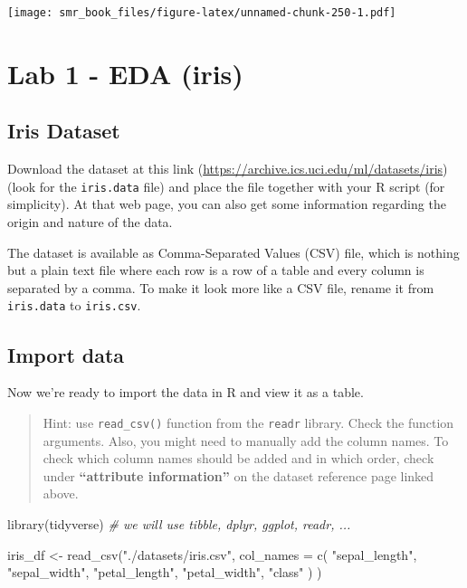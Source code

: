 \documentclass[
  oneside]{book}
\newenvironment{Shaded}{\begin{snugshade}}{\end{snugshade}}
\newcommand{\AttributeTok}[1]{\textcolor[rgb]{0.77,0.63,0.00}{#1}}
\newcommand{\CommentTok}[1]{\textcolor[rgb]{0.56,0.35,0.01}{\textit{#1}}}
\newcommand{\FunctionTok}[1]{\textcolor[rgb]{0.00,0.00,0.00}{#1}}
\newcommand{\NormalTok}[1]{#1}
\newcommand{\OtherTok}[1]{\textcolor[rgb]{0.56,0.35,0.01}{#1}}
\newcommand{\StringTok}[1]{\textcolor[rgb]{0.31,0.60,0.02}{#1}}
\begin{document}
\texttt{[image: smr\_book\_files/figure-latex/unnamed-chunk-250-1.pdf]}

\hypertarget{lab-1---eda-iris}{%
\chapter{Lab 1 - EDA (iris)}\label{lab-1---eda-iris}}

\hypertarget{iris-dataset}{%
\section{Iris Dataset}\label{iris-dataset}}

Download the dataset at this link (\url{https://archive.ics.uci.edu/ml/datasets/iris})
(look for the \texttt{iris.data} file) and place the file together with your R script (for simplicity).
At that web page, you can also get some information regarding the origin and
nature of the data.

The dataset is available as Comma-Separated Values (CSV) file, which is nothing
but a plain text file where each row is a row of a table and every column is separated
by a comma. To make it look more like a CSV file, rename it from \texttt{iris.data} to \texttt{iris.csv}.

\hypertarget{import-data}{%
\section{Import data}\label{import-data}}

Now we're ready to import the data in R and view it as a table.

\begin{quote}
Hint: use \texttt{read\_csv()} function from the \texttt{readr} library. Check
the function arguments. Also, you might need to manually add the column names.
To check which column names should be added and in which order,
check under \textbf{``attribute information''} on the dataset reference page linked above.
\end{quote}

\begin{Shaded}
\begin{Highlighting}[]
\FunctionTok{library}\NormalTok{(tidyverse) }\CommentTok{\# we will use tibble, dplyr, ggplot, readr, ...}
\end{Highlighting}
\end{Shaded}

\begin{Shaded}
\begin{Highlighting}[]
\NormalTok{iris\_df }\OtherTok{\textless{}{-}} \FunctionTok{read\_csv}\NormalTok{(}\StringTok{"./datasets/iris.csv"}\NormalTok{,}
  \AttributeTok{col\_names =} \FunctionTok{c}\NormalTok{(}
    \StringTok{"sepal\_length"}\NormalTok{, }\StringTok{"sepal\_width"}\NormalTok{,}
    \StringTok{"petal\_length"}\NormalTok{, }\StringTok{"petal\_width"}\NormalTok{, }\StringTok{"class"}
\NormalTok{  )}
\NormalTok{)}
\end{Highlighting}
\end{Shaded}
\end{document}
